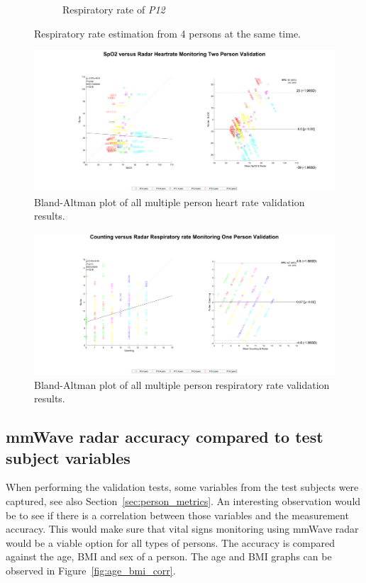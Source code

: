 \begin{figure}[t]
\begin{subfigure}{.45\textwidth}
  \caption{Respiratory rate of \emph{P12}}
  \label{fig:romy4_breath}
\end{subfigure}
\caption{Respiratory rate estimation from 4 persons at the same time.}
\label{fig:4pers_breath_meas}
\end{figure}

\begin{figure}[t]
    \centering
    \hspace*{-2cm}\includegraphics[width=1.2\textwidth]{figures/validation/bland_altman_multiple.pdf}
    \caption{Bland-Altman plot of all multiple person heart rate validation results.}
    \label{fig:ba_multiple_heart}
\end{figure}

\begin{figure}[t]
    \centering
    \hspace*{-2cm}\includegraphics[width=1.2\textwidth]{figures/validation/bland_altman_multiple_BR.pdf}
    \caption{Bland-Altman plot of all multiple person respiratory rate validation results.}
    \label{fig:ba_multiple_breath}
\end{figure}

\subsection{mmWave radar accuracy compared to test subject variables}
When performing the validation tests, some variables from the test subjects were captured, see also Section~\ref{sec:person_metrics}. An interesting observation would be to see if there is a correlation between those variables and the measurement accuracy. This would make sure that vital signs monitoring using mmWave radar would be a viable option for all types of persons. The accuracy is compared against the age, BMI and sex of a person. The age and BMI graphs can be observed in Figure~\ref{fig:age_bmi_corr}.


